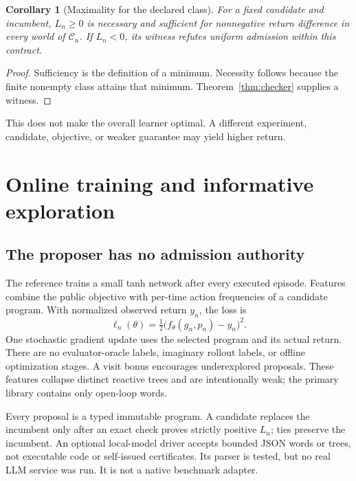 \documentclass[10pt,twocolumn]{article}
\newtheorem{corollary}[theorem]{Corollary}
\newcommand{\C}{\mathcal C}
\begin{document}
\begin{corollary}[Maximality for the declared class]\label{cor:maximal}
For a fixed candidate and incumbent, $L_n\geq0$ is necessary and sufficient for
nonnegative return difference in every world of $\C_n$. If $L_n<0$, its witness
refutes uniform admission within this contract.
\end{corollary}
\begin{proof}
Sufficiency is the definition of a minimum. Necessity follows because the finite
nonempty class attains that minimum. Theorem~\ref{thm:checker} supplies a witness.
\end{proof}
This does not make the overall learner optimal. A different experiment,
candidate, objective, or weaker guarantee may yield higher return.

\section{Online training and informative exploration}
\subsection{The proposer has no admission authority}
The reference trains a small tanh network after every executed episode.
Features combine the public objective with per-time action frequencies of a
candidate program. With normalized observed return $y_n$, the loss is
\begin{equation}
 \ell_n(\theta)=\tfrac12\big(f_\theta(g_n,p_n)-y_n\big)^2.
\end{equation}
One stochastic gradient update uses the selected program and its actual return.
There are no evaluator-oracle labels, imaginary rollout labels, or offline
optimization stages. A visit bonus encourages underexplored proposals.
These features collapse distinct reactive trees and are intentionally weak;
the primary library contains only open-loop words.

Every proposal is a typed immutable program. A candidate replaces the incumbent
only after an exact check proves strictly positive $L_n$; ties preserve the
incumbent. An optional local-model driver accepts bounded JSON words or trees,
not executable code or self-issued certificates. Its parser is tested, but no
real LLM service was run. It is not a native benchmark adapter.
\end{document}
